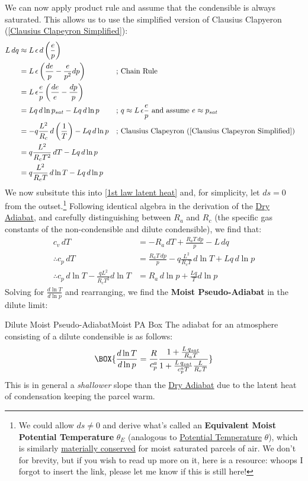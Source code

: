 We can now apply product rule and assume that the condensible is always saturated. This allows us to use the simplified version of Clausius Clapyeron (\ref{Clausius Clapeyron Simplified}):
\begin{align*}
    L\,dq &\approx L \,\epsilon \,d \left( \frac{e}{p} \right)\\
    &= L \, \epsilon \left( \frac{de}{p} - \frac{e}{p^2}dp \right)
    &\text{; }
    &\text{Chain Rule}
    \\
    &= L\,\epsilon\frac{e}{p}\left( \frac{de}{e} - \frac{dp}{p} \right)
    \\
    &=Lq\,d\ln p_{sat}-Lq\,d\ln p
    &\text{; }
    &q\approx L\,\epsilon \frac{e}{p} \text{ and assume } e\approx p_{sat}
    \\
    &=-q\frac{L^2}{R_c}\,d\left( \frac{1}{T} \right)-Lq\,d\ln p
    &\text{; }
    &\text{Clausius Clapeyron (\ref{Clausius Clapeyron Simplified})}\\
    &=q\frac{L^2}{R_c T^2}\,dT-Lq\,d\ln p\\
    &=q\frac{L^2}{R_cT}\,d\ln T-Lq\,d\ln p
\end{align*}
We now subsitute this into \ref{1st law latent heat} and, for simplicity, let \(ds=0\) from the outset.\footnote{We could allow \(ds\neq 0\) and derive what's called an \textbf{Equivalent Moist Potential Temperature} \(\theta_E\) (analogous to \hyperref[eq Potential Temperature]{Potential Temperature} \(\theta\)), which is similarly \hyperref[Material Conservation]{materially conserved} for moist saturated parcels of air. We don't for brevity, but if you wish to read up more on it, here is a resource: whoops I forgot to insert the link, please let me know if this is still here!} Following identical algebra in the derivation of the \hyperref[Dry Adiabat]{Dry Adiabat}, and carefully distinguishing between \(R_a\) and \(R_c\) (the specific gas constants of the non-condensible and dilute condensible), we find that:
\begin{align*}
    c_v\,dT & =-R_a\,dT+\frac{R_aT\,dp}{p}-L\,dq\\
    \therefore c_p\,dT &= \frac{R_a T\,dp}{p} - q\frac{L^2}{R_cT}\,d\ln T+Lq\,d\ln p\\
    \therefore c_p\,d\ln T - \frac{q L^2}{R_c T^2}d\ln T&=R_a\,d\ln p + \frac{Lq}{T}d\ln p
\end{align*}
Solving for \(\frac{d\ln T}{d\ln p}\) and rearranging, we find the \textbf{Moist Pseudo-Adiabat} in the dilute limit:
\begin{fact}{Dilute Moist Pseudo-Adiabat}{Moist PA Box}\label{Moist PA Box}
    The adiabat for an atmosphere consisting of a dilute condensible is as follows:
    \begin{align}\label{dilute moist adiabat}
        \BOX{\frac{d\ln T}{d\ln p}=\frac{R}{c_p^a}\frac{1+\frac{L\,q_{sat}}{R_aT}}{1+\frac{L\,q_{sat}}{c_p^aT}\frac{L}{R_cT}}}
    \end{align}
    This is in general a \textit{shallower} slope than the \hyperref[Dry Adiabat Box]{Dry Adiabat} due to the latent heat of condensation keeping the parcel warm.
\end{fact}
